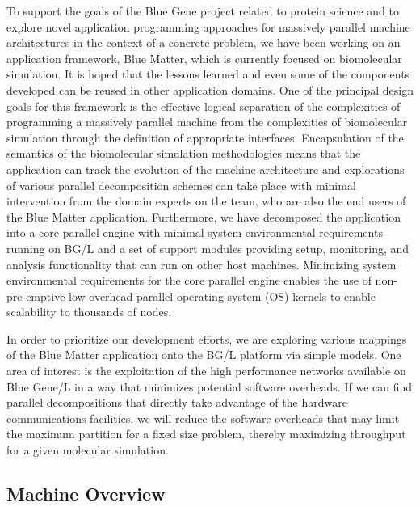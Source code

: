 \documentclass[doublespacing]{elsart}
\begin{document}
To support the goals of the Blue Gene project related to protein
science and to explore novel application programming approaches for
massively parallel machine architectures in the context of a concrete
problem, we have been working on an application framework, Blue
Matter, which is currently focused on biomolecular simulation. It is
hoped that the lessons learned and even some of the components
developed can be reused in other application domains.  One of the
principal design goals for this framework is the effective logical
separation of the complexities of programming a massively parallel
machine from the complexities of biomolecular simulation through the
definition of appropriate interfaces.  Encapsulation of the semantics
of the biomolecular simulation methodologies means that the
application can track the evolution of the machine architecture and
explorations of various parallel decomposition schemes can take place
with minimal intervention from the domain experts on the team, who are
also the end users of the Blue Matter application. Furthermore, we
have decomposed the application into a core parallel engine with
minimal system environmental requirements running on BG/L and a set of
support modules providing setup, monitoring, and analysis
functionality that can run on other host machines.  Minimizing system
environmental requirements for the core parallel engine enables the
use of non-pre-emptive low overhead parallel operating system (OS)
kernels\cite{fitch:1993} to enable scalability to thousands of nodes.

In order to prioritize our development efforts, we are exploring
various mappings of the Blue Matter application onto the BG/L platform
via simple models.  One area of interest is the exploitation of the
high performance networks available on Blue Gene/L in a way that
minimizes potential software overheads.  If we can find parallel
decompositions that directly take advantage of the hardware
communications facilities, we will reduce the software overheads that
may limit the maximum partition for a fixed size problem, thereby
maximizing throughput for a given molecular simulation.

\subsection{Machine Overview}
\end{document}
